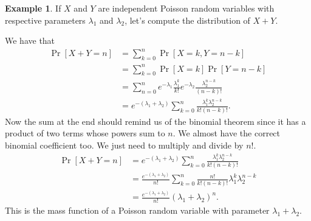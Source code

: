 \documentclass[12pt]{article}
\theoremstyle{plain}
\theoremstyle{definition}
\newtheorem{example}[theorem]{Example}
\theoremstyle{remark}
\begin{document}
\begin{example}
    If $X$ and $Y$ are independent Poisson random variables with respective parameters $\lambda_1$ and $\lambda_2$, let's compute the distribution of $X+Y$.

    We have that
    \begin{align*}
        \Pr[X+Y = n] &= \sum_{k=0}^n\Pr[X = k, Y = n-k]\\
        &= \sum_{k=0}^n\Pr[X=k]\Pr[Y=n-k]\\
        &= \sum_{n=0}^n e^{-\lambda_1}\frac{\lambda_1^k}{k!}e^{-\lambda_2}\frac{\lambda_2^{n-k}}{(n-k)!}\\
        &= e^{-(\lambda_1+\lambda_2)}\sum_{k=0}^n\frac{\lambda_1^k\lambda_2^{n-k}}{k!(n-k)!}.
    \end{align*}
    Now the sum at the end should remind us of the binomial theorem since it has a product of two terms whose powers sum to $n$.
    We almost have the correct binomial coefficient too.
    We just need to multiply and divide by $n!$.
    \begin{align*}
        \Pr[X+Y = n] &= e^{-(\lambda_1+\lambda_2)}\sum_{k=0}^n\frac{\lambda_1^k\lambda_2^{n-k}}{k!(n-k)!}\\
        &= \frac{e^{-(\lambda_1+\lambda_2)}}{n!} \sum_{k=0}^n\frac{n!}{k!(n-k)!}\lambda_1^k\lambda_2^{n-k}\\
        &= \frac{e^{-(\lambda_1+\lambda_2)}}{n!}(\lambda_1+\lambda_2)^n.
    \end{align*}
    This is the mass function of a Poisson random variable with parameter $\lambda_1+\lambda_2$.
\end{example}
\end{document}
